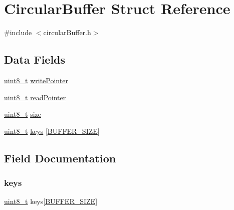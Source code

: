 \hypertarget{struct_circular_buffer}{}\section{Circular\+Buffer Struct Reference}
\label{struct_circular_buffer}


{\ttfamily \#include $<$circular\+Buffer.\+h$>$}

\subsection*{Data Fields}
\begin{DoxyCompactItemize}
\item 
\mbox{\hyperlink{_regs___l_p_c176x_8h_aba7bc1797add20fe3efdf37ced1182c5}{uint8\+\_\+t}} \mbox{\hyperlink{struct_circular_buffer_a6d15a4d8d6155ad6e4ad9f790b9dc73f}{write\+Pointer}}
\item 
\mbox{\hyperlink{_regs___l_p_c176x_8h_aba7bc1797add20fe3efdf37ced1182c5}{uint8\+\_\+t}} \mbox{\hyperlink{struct_circular_buffer_a20080c7fe1d1a703c43a00b6cd132171}{read\+Pointer}}
\item 
\mbox{\hyperlink{_regs___l_p_c176x_8h_aba7bc1797add20fe3efdf37ced1182c5}{uint8\+\_\+t}} \mbox{\hyperlink{struct_circular_buffer_ae5dc6ffcd9b7605c7787791e40cc6bb0}{size}}
\item 
\mbox{\hyperlink{_regs___l_p_c176x_8h_aba7bc1797add20fe3efdf37ced1182c5}{uint8\+\_\+t}} \mbox{\hyperlink{struct_circular_buffer_a5ee92d370b4dd63a11863476b8d039e8}{keys}} \mbox{[}\mbox{\hyperlink{circular_buffer_8h_a6b20d41d6252e9871430c242cb1a56e7}{B\+U\+F\+F\+E\+R\+\_\+\+S\+I\+ZE}}\mbox{]}
\end{DoxyCompactItemize}


\subsection{Field Documentation}
\mbox{\label{struct_circular_buffer_a5ee92d370b4dd63a11863476b8d039e8}} 
\subsubsection{\texorpdfstring{keys}{keys}}
{\footnotesize\ttfamily \mbox{\hyperlink{_regs___l_p_c176x_8h_aba7bc1797add20fe3efdf37ced1182c5}{uint8\+\_\+t}} keys\mbox{[}\mbox{\hyperlink{circular_buffer_8h_a6b20d41d6252e9871430c242cb1a56e7}{B\+U\+F\+F\+E\+R\+\_\+\+S\+I\+ZE}}\mbox{]}}

